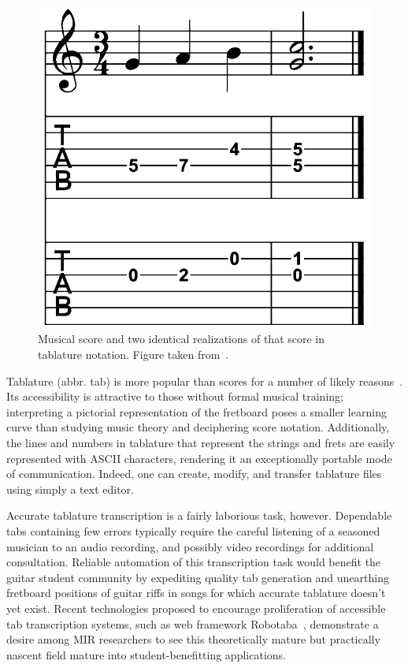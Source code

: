 \documentclass[12pt]{cmuthesis}
\begin{document}
\begin{figure}[!htbp] 
\centering
\includegraphics[scale=0.25]{score-tabs}
\caption{Musical score and two identical realizations of that score in tablature notation. Figure taken from~\cite{barbanchoi2012}.}
\label{fig:score-tabs}
\end{figure}

Tablature (abbr. tab) is more popular than scores for a number of likely reasons~\cite{macrae2010}. Its accessibility is attractive to those without formal musical training; interpreting a pictorial representation of the fretboard poses a smaller learning curve than studying music theory and deciphering score notation. Additionally, the lines and numbers in tablature that represent the strings and frets are easily represented with ASCII characters, rendering it an exceptionally portable mode of communication. Indeed, one can create, modify, and transfer tablature files using simply a text editor.

Accurate tablature transcription is a fairly laborious task, however. Dependable tabs containing few errors typically require the careful listening of a seasoned musician to an audio recording, and possibly video recordings for additional consultation. Reliable automation of this transcription task would benefit the guitar student community by expediting quality tab generation and unearthing fretboard positions of guitar riffs in songs for which accurate tablature doesn't yet exist. Recent technologies proposed to encourage proliferation of accessible tab transcription systems, such as web framework Robotaba~\cite{burlet2013}, demonstrate a desire among MIR researchers to see this theoretically mature but practically nascent field mature into student-benefitting applications. 
\end{document}
